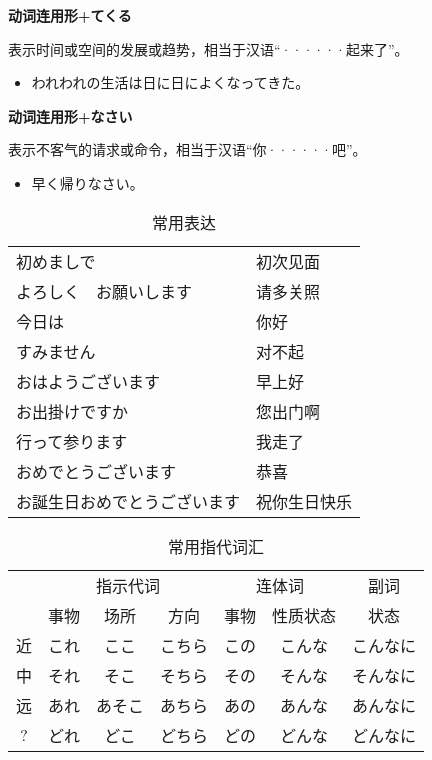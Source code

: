 {\bf
\noindent 动词连用形+てくる
}

表示时间或空间的发展或趋势，相当于汉语``······起来了''。
\begin{itemize}
  \item われわれの生活は日に日によくなってきた。
\end{itemize}

{\bf
\noindent 动词连用形+なさい
}

表示不客气的请求或命令，相当于汉语``你······吧''。
\begin{itemize}
  \item 早く帰りなさい。
\end{itemize}


\begin{table}[h]
  \centering
  \caption{常用表达}
  \label{tab:label}
  \small
  \begin{tabular}{ll}
    初めましで & 初次见面 \\
    よろしく　お願いします & 请多关照 \\
    今日は & 你好 \\
    すみません & 对不起 \\
    おはようございます & 早上好 \\
    お出掛けですか & 您出门啊 \\
    行って参ります & 我走了 \\
    おめでとうございます & 恭喜 \\
    お誕生日おめでとうございます & 祝你生日快乐 \\
  \end{tabular}
\end{table}

\begin{table}[h]
  \centering
  \caption{常用指代词汇}
  \label{tab:label}
  \small
  \begin{tabular}{c|ccc|cc|c}
    & \multicolumn{3}{c|}{指示代词} & \multicolumn{2}{c|}{连体词} & 副词 \\
    & 事物 & 场所 & 方向 & 事物 & 性质状态 & 状态 \\
    \hline
    近 & これ & ここ   & こちら & この & こんな & こんなに \\
    中 & それ & そこ   & そちら & その & そんな & そんなに \\
    远 & あれ & あそこ & あちら & あの & あんな & あんなに \\
    ?  & どれ & どこ   & どちら & どの & どんな & どんなに \\
  \end{tabular}
\end{table}

